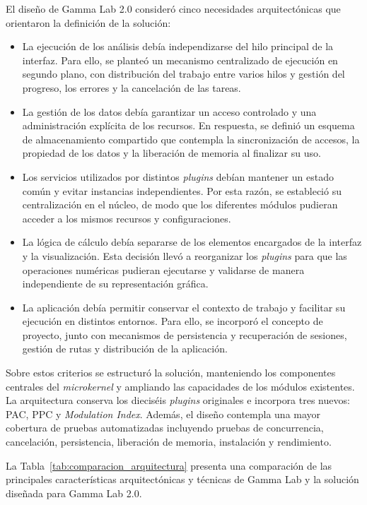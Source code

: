 \documentclass[12pt,letterpaper,oneside]{article}
\begin{document}
El diseño de Gamma Lab 2.0 consideró cinco necesidades arquitectónicas que orientaron la definición de la solución:

\begin{itemize}
  \item La ejecución de los análisis debía independizarse del hilo principal de la interfaz. Para ello, se planteó un mecanismo centralizado de ejecución en segundo plano, con distribución del trabajo entre varios hilos y gestión del progreso, los errores y la cancelación de las tareas.
  \item La gestión de los datos debía garantizar un acceso controlado y una administración explícita de los recursos. En respuesta, se definió un esquema de almacenamiento compartido que contempla la sincronización de accesos, la propiedad de los datos y la liberación de memoria al finalizar su uso.
  \item Los servicios utilizados por distintos \textit{plugins} debían mantener un estado común y evitar instancias independientes. Por esta razón, se estableció su centralización en el núcleo, de modo que los diferentes módulos pudieran acceder a los mismos recursos y configuraciones.
  \item La lógica de cálculo debía separarse de los elementos encargados de la interfaz y la visualización. Esta decisión llevó a reorganizar los \textit{plugins} para que las operaciones numéricas pudieran ejecutarse y validarse de manera independiente de su representación gráfica.
  \item La aplicación debía permitir conservar el contexto de trabajo y facilitar su ejecución en distintos entornos. Para ello, se incorporó el concepto de proyecto, junto con mecanismos de persistencia y recuperación de sesiones, gestión de rutas y distribución de la aplicación.
\end{itemize}

Sobre estos criterios se estructuró la solución, manteniendo los componentes centrales del \textit{microkernel} y ampliando las capacidades de los módulos existentes. La arquitectura conserva los dieciséis \textit{plugins} originales e incorpora tres nuevos: PAC, PPC y \textit{Modulation Index}. Además, el diseño contempla una mayor cobertura de pruebas automatizadas incluyendo pruebas de concurrencia, cancelación, persistencia, liberación de memoria, instalación y rendimiento.

La Tabla~\ref{tab:comparacion_arquitectura} presenta una comparación de las principales características arquitectónicas y técnicas de Gamma Lab y la solución diseñada para Gamma Lab 2.0.
\end{document}

